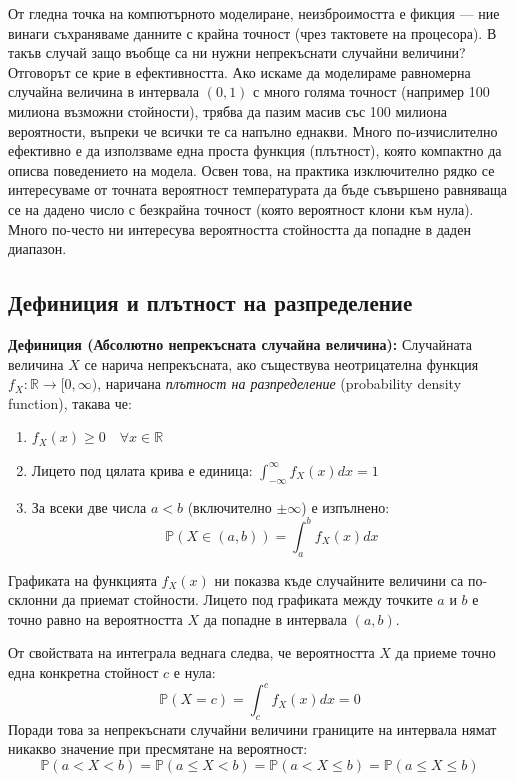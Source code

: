 \documentclass{article}
\begin{document}
От гледна точка на компютърното моделиране, неизброимостта е фикция — ние винаги съхраняваме данните с крайна точност (чрез тактовете на процесора). В такъв случай защо въобще са ни нужни непрекъснати случайни величини? 
Отговорът се крие в ефективността. Ако искаме да моделираме равномерна случайна величина в интервала $(0,1)$ с много голяма точност (например 100 милиона възможни стойности), трябва да пазим масив със 100 милиона вероятности, въпреки че всички те са напълно еднакви. Много по-изчислително ефективно е да използваме една проста функция (плътност), която компактно да описва поведението на модела. 
Освен това, на практика изключително рядко се интересуваме от точната вероятност температурата да бъде съвършено равняваща се на дадено число с безкрайна точност (която вероятност клони към нула). Много по-често ни интересува вероятността стойността да попадне в даден диапазон.

\subsection{Дефиниция и плътност на разпределение}

\textbf{Дефиниция (Абсолютно непрекъсната случайна величина):} Случайната величина $X$ се нарича непрекъсната, ако съществува неотрицателна функция $f_X: \mathbb{R} \to [0, \infty)$, наричана \emph{плътност на разпределение} (probability density function), такава че:
\begin{enumerate}
    \item $f_X(x) \ge 0 \quad \forall x \in \mathbb{R}$
    \item Лицето под цялата крива е единица: $\int_{-\infty}^{\infty} f_X(x) dx = 1$
    \item За всеки две числа $a < b$ (включително $\pm\infty$) е изпълнено:
    \[
    \mathbb{P}(X \in (a, b)) = \int_{a}^{b} f_X(x) dx
    \]
\end{enumerate}

Графиката на функцията $f_X(x)$ ни показва къде случайните величини са по-склонни да приемат стойности. Лицето под графиката между точките $a$ и $b$ е точно равно на вероятността $X$ да попадне в интервала $(a,b)$.

От свойствата на интеграла веднага следва, че вероятността $X$ да приеме точно една конкретна стойност $c$ е нула:
\[
\mathbb{P}(X = c) = \int_{c}^{c} f_X(x) dx = 0
\]
Поради това за непрекъснати случайни величини границите на интервала нямат никакво значение при пресмятане на вероятност:
\[
\mathbb{P}(a < X < b) = \mathbb{P}(a \le X < b) = \mathbb{P}(a < X \le b) = \mathbb{P}(a \le X \le b)
\]
\end{document}
